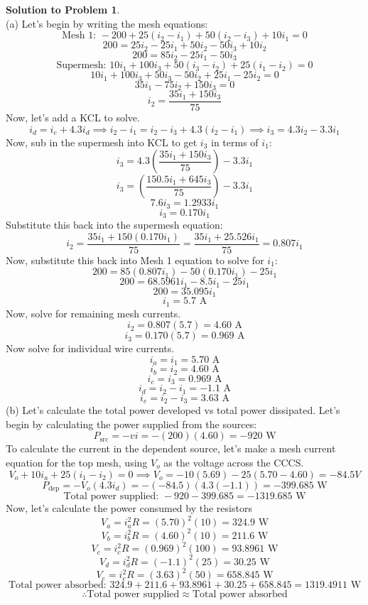 \documentclass[11pt,letterpaper]{article}
\theoremstyle{definition}
\newtheorem{solprob}{\textcolor{solproblemcolor}{Solution to Problem}}  %
\begin{document}
\begin{solprob} \text{}\\
    (a) Let's begin by writing the mesh equations:
    \[\text{Mesh 1: } -200 + 25(i_2-i_1)+50(i_2-i_3) + 10i_1 = 0\]
    \[200 = 25i_2 - 25i_1 + 50i_2 - 50i_3 + 10i_2\]
    \[200 = 85i_2-25i_1-50i_3\]
    \[\text{Supermesh: } 10i_1+100i_3+50(i_3-i_2)+25(i_1-i_2) = 0\]
    \[10i_1+100i_3+50i_3-50i_2+25i_1-25i_2=0\]
    \[35i_1-75i_2+150i_3 = 0\]
    \[i_2 = \frac{35i_1+150i_3}{75}\]
    Now, let's add a KCL to solve.
    \[i_d=i_e+4.3i_d \implies i_2-i_1=i_2-i_3+4.3(i_2-i_1)\implies i_3 = 4.3i_2 - 3.3i_1\]
    Now, sub in the supermesh into KCL to get $i_3$ in terms of $i_1$:
    \[i_3 = 4.3(\frac{35i_1+150i_3}{75})-3.3i_1\]
    \[i_3 = (\frac{150.5i_1+645i_3}{75})-3.3i_1\]
    \[7.6i_3 = 1.2933i_1\]
    \[i_3 = 0.170i_1\]
    Substitute this back into the supermesh equation:
    \[i_2 = \frac{35i_1 + 150(0.170i_1)}{75} = \frac{35i_1+25.526i_1}{75} = 0.807i_1\]
    Now, substitute this back into Mesh 1 equation to solve for $i_1$:
    \[200 = 85(0.807i_1)-50(0.170i_1)-25i_1\]
    \[200 = 68.5961i_1-8.5i_1-25i_1\]
    \[200 = 35.095i_1\]
    \[i_1 = 5.7\text{ A}\]
    Now, solve for remaining mesh currents.
    \[i_2 = 0.807(5.7) = 4.60 \text{ A}\]
    \[i_3 = 0.170(5.7) = 0.969\text{ A}\]
    Now solve for individual wire currents.
    \[i_a = i_1 = 5.70 \text{ A}\]
    \[i_b = i_2 = 4.60 \text{ A}\]
    \[i_c = i_3 = 0.969 \text{ A}\]
    \[i_d = i_2-i_1 = -1.1 \text{ A}\]
    \[i_e = i_2-i_3 = 3.63 \text{ A}\]
    (b) Let's calculate the total power developed vs total power dissipated.  Let's begin by calculating the power supplied from the sources:
    \[P_\text{src} = -vi = -(200)(4.60) = -920 \text{ W}\]
    To calculate the current in the dependent source, let's make a mesh current equation for the top mesh, using $V_o$ as the voltage across the CCCS.
    \[V_o + 10i_a +25(i_1-i_2) = 0 \implies V_o = -10(5.69) - 25(5.70-4.60) = -84.5 V\]
    \[P_\text{dep} = -V_o(4.3i_d) = -(-84.5)(4.3(-1.1)) = -399.685 \text{ W}\]
    \[\text{Total power supplied: } -920 - 399.685 = -1319.685 \text{ W}\]
    Now, let's calculate the power consumed by the resistors
    \[V_a = i_a^2R = (5.70)^2(10) = 324.9 \text{ W}\]
    \[V_b = i_b^2R = (4.60)^2(10) = 211.6 \text{ W}\]
    \[V_c = i_c^2R = (0.969)^2(100) = 93.8961 \text{ W}\]
    \[V_d = i_d^2R = (-1.1)^2(25) = 30.25 \text{ W}\]
    \[V_e = i_e^2R =  (3.63)^2(50) = 658.845 \text{ W}\]
    \[\text{Total power absorbed: } 324.9+211.6+93.8961+30.25+658.845 = 1319.4911 \text{ W}\]
    \[\therefore \text{Total power supplied}\approx \text{Total power absorbed}\]
\end{solprob}
\end{document}
